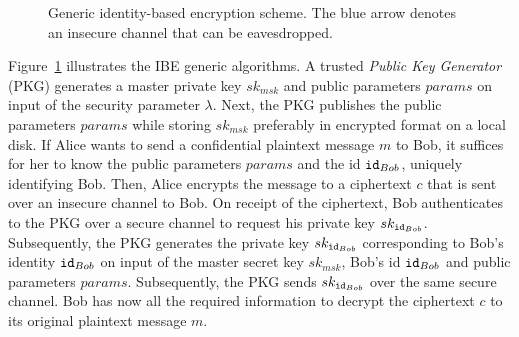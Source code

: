 \begin{figure}[ht]
\begin{center}
{
    }
    \end{center}
    \caption{Generic identity-based encryption scheme. The blue arrow denotes an insecure channel that can be eavesdropped.}
    \label{fig:generic_ibe_scheme}
\end{figure}

Figure~\ref{fig:generic_ibe_scheme} illustrates the IBE generic algorithms. A trusted \textit{Public Key Generator} (PKG) generates a master private key $sk_{msk}$ and public parameters $params$ on input of the security parameter $\lambda$. Next, the PKG publishes the public parameters $params$ while storing $sk_{msk}$ preferably in encrypted format on a local disk. If Alice wants to send a confidential plaintext message $m$ to Bob, it suffices for her to know the public parameters $params$ and the id $\mathtt{id}_{Bob}$, uniquely identifying Bob. Then, Alice encrypts the message to a ciphertext $c$ that is sent over an insecure channel to Bob. On receipt of the ciphertext, Bob authenticates to the PKG over a secure channel to request his private key $sk_{\mathtt{id}_{Bob}}$. Subsequently, the PKG generates the private key $sk_{\mathtt{id}_{Bob}}$ corresponding to Bob's identity $\mathtt{id}_{Bob}$ on input of the master secret key $sk_{msk}$, Bob's id $\mathtt{id}_{Bob}$ and public parameters $params$. Subsequently, the PKG sends $sk_{\mathtt{id}_{Bob}}$ over the same secure channel. Bob has now all the required information to decrypt the ciphertext $c$ to its original plaintext message $m$.

